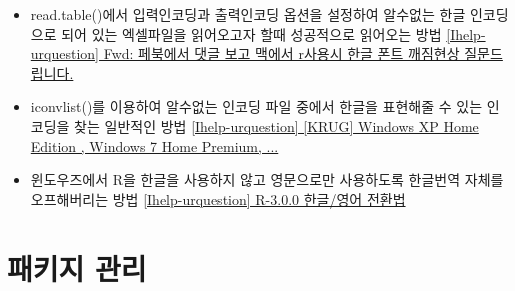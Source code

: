 \documentclass[tutorial.tex]{subfiles}
\begin{document}
\begin{itemize}
\item read.table()에서 입력인코딩과 출력인코딩 옵션을 설정하여 알수없는 한글 인코딩으로 되어 있는 엑셀파일을 읽어오고자 할때 성공적으로 읽어오는 방법   \href{http://lists.r-forge.r-project.org/pipermail/ihelp-urquestion/2013-April/000016.html}{[Ihelp-urquestion] Fwd: 페북에서 댓글 보고 맥에서 r사용시 한글 폰트 깨짐현상 질문드립니다.}
\item iconvlist()를 이용하여 알수없는 인코딩 파일 중에서 한글을 표현해줄 수 있는 인코딩을 찾는 일반적인 방법  \href{http://lists.r-forge.r-project.org/pipermail/ihelp-urquestion/2013-April/000017.html}{[Ihelp-urquestion] [KRUG] Windows XP Home Edition , Windows 7 Home Premium, ...}
\item 윈도우즈에서 R을 한글을 사용하지 않고 영문으로만 사용하도록 한글번역 자체를 오프해버리는 방법  \href{http://lists.r-forge.r-project.org/pipermail/ihelp-urquestion/2013-April/000003.html}{[Ihelp-urquestion] R-3.0.0 한글/영어 전환법}
\end{itemize}

\section{패키지 관리}
\end{document}

